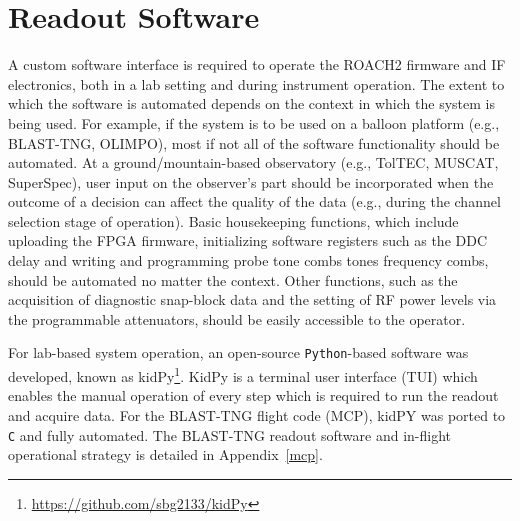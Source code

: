 \section{Readout Software}\label{software}

A custom software interface is required to operate the ROACH2 firmware and IF electronics, both in a lab setting and during instrument operation. The extent to which the software is automated depends on the context in which the system is being used. For example, if the system is to be used on a balloon platform (e.g., BLAST-TNG, OLIMPO), most if not all of the software functionality should be automated. At a ground/mountain-based observatory (e.g., TolTEC, MUSCAT, SuperSpec), user input on the observer's part should be incorporated when the outcome of a decision can affect the quality of the data (e.g., during the channel selection stage of operation). Basic housekeeping functions, which include uploading the FPGA firmware, initializing software registers such as the DDC delay and writing and programming probe tone combs tones frequency combs, should be automated no matter the context. Other functions, such as the acquisition of diagnostic snap-block data and the setting of RF power levels via the programmable attenuators, should be easily accessible to the operator.

For lab-based system operation, an open-source \texttt{Python}-based software was developed, known as kidPy\footnote{\url{https://github.com/sbg2133/kidPy}}. KidPy is a terminal user interface (TUI) which enables the manual operation of every step which is required to run the readout and acquire data. For the BLAST-TNG flight code (MCP), kidPY was ported to \texttt{C} and fully automated. The BLAST-TNG readout software and in-flight operational strategy is detailed in Appendix~\ref{mcp}.

